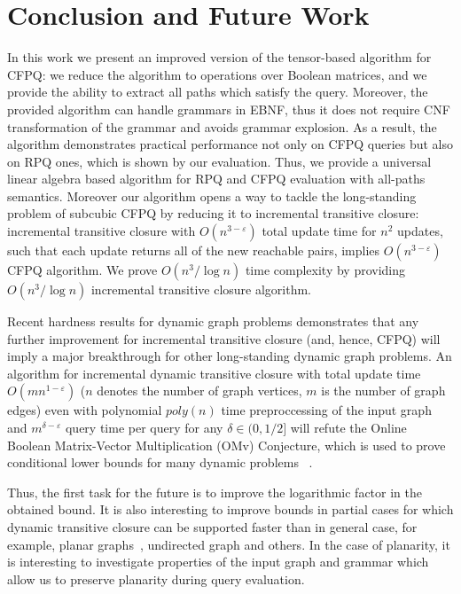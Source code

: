 \section{Conclusion and Future Work}

In this work we present an improved version of the tensor-based algorithm for CFPQ: we reduce the algorithm to operations over Boolean matrices, and we provide the ability to extract all paths which satisfy the query.
Moreover, the provided algorithm can handle grammars in EBNF, thus it does not require CNF transformation of the grammar and avoids grammar explosion.
As a result, the algorithm demonstrates practical performance not only on CFPQ queries but also on RPQ ones, which is shown by our evaluation.
Thus, we provide a universal linear algebra based algorithm for RPQ and CFPQ evaluation with all-paths semantics.
Moreover our algorithm opens a way to tackle the long-standing problem of subcubic CFPQ by reducing it to incremental transitive closure: incremental transitive closure with $O(n^{3-\varepsilon})$ total update time for $n^2$ updates, such that each update returns all of the new reachable pairs, implies $O(n^{3-\varepsilon})$ CFPQ algorithm.
We prove $O(n^3/\log{n})$ time complexity by providing $O(n^3/\log{n})$ incremental transitive closure algorithm.


Recent hardness results for dynamic graph problems demonstrates that any further improvement for incremental transitive closure (and, hence, CFPQ) will imply a major breakthrough for other long-standing dynamic graph problems. An algorithm for incremental dynamic transitive closure with total update time $O(mn^{1-\varepsilon})$ ($n$ denotes the number of graph vertices, $m$ is the number of graph edges) even with polynomial $poly(n)$ time preproccessing of the input graph and $m^{\delta - \varepsilon}$ query time per query for any $\delta \in (0, 1/2]$ will refute the Online Boolean Matrix-Vector Multiplication (OMv) Conjecture, which is used to prove conditional lower bounds for many dynamic problems ~\cite{8948597, 10.1145/2746539.2746609}.


Thus, the first task for the future is to improve the logarithmic factor in the obtained bound.
It is also interesting to improve bounds in partial cases for which dynamic transitive closure can be supported faster than in general case, for example, planar graphs~\cite{10.1007/3-540-57273-2_72}, undirected graph and others.
In the case of planarity, it is interesting to investigate properties of the input graph and grammar which allow us to preserve planarity during query evaluation.


